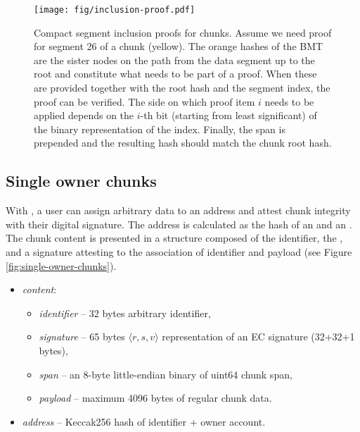 \begin{figure}[htbp]
\centering
\texttt{[image: fig/inclusion-proof.pdf]}
\caption[Compact segment inclusion proofs for chunks \statusgreen]{Compact segment inclusion proofs for chunks. Assume we need proof for segment 26 of a chunk (yellow). The orange hashes of the BMT are the sister nodes on the path from the data segment up to the root and constitute what needs to be part of a proof. When these are provided together with the root hash and the segment index, the proof can be verified. The side on which proof item $i$ needs to be applied depends on the $i$-th bit (starting from least significant) of the binary representation of the index. Finally, the span is prepended and the resulting hash should match the chunk root hash.}
\label{fig:chunk-inclusion}
\end{figure}


\subsection{Single owner chunks\statusgreen}\label{sec:single-owner-chunks}

With , a user can assign arbitrary data to an address and attest chunk integrity with their digital signature. The address is calculated as the hash of an  and an . The chunk content is presented in a  structure composed of the identifier, the , and a signature attesting to the association of identifier and payload (see Figure \ref{fig:single-owner-chunks}).

\begin{itemize}
    \item \emph{content}: 
\begin{itemize}
    \item \emph{identifier} -- 32 bytes arbitrary identifier, 
    \item \emph{signature} -- 65 bytes $\langle r,s,v \rangle$ representation of an EC signature (32+32+1 bytes),
    \item \emph{span} -- an 8-byte little-endian binary of uint64 chunk span,
    \item \emph{payload} -- maximum 4096 bytes of regular chunk data.
\end{itemize}
    \item \emph{address} -- Keccak256 hash of identifier + owner account.
\end{itemize}

